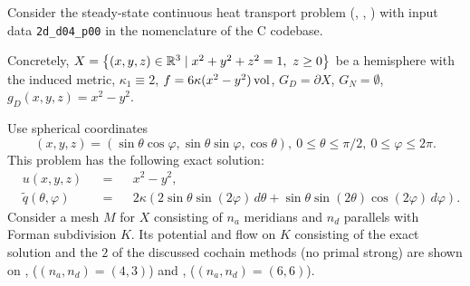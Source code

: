 \begin{example}
  \label{idec/diffusion/continuous/steady_state/examples/2d_d04_p00-example}
  Consider the steady-state continuous heat transport problem
  (,
   ,
   )
  with input data \verb|2d_d04_p00| in the nomenclature of the C codebase.

  Concretely,
    $X = \left\{ (x, y, z) \in \mathbb{R}^3 \mid x^2 + y^2 + z^2 = 1,\ z \geq 0 \right\}$ be a
      hemisphere with the induced metric,
    $\kappa_1 \equiv 2$,
    $f = 6 \kappa (x^2 - y^2) \mathop{\rm vol}\nolimits$,
    $G_D = \partial X$,
    $G_N = \emptyset$,
    $g_D(x, y, z) = x^2 - y^2$.

  Use spherical coordinates
  \begin{equation}
    (x, y, z)
    = (\sin \theta \cos \varphi, \sin \theta \sin \varphi, \cos \theta),\
    0 \leq \theta \leq \pi / 2,\
    0 \leq \varphi \leq 2 \pi.
  \end{equation}
  This problem has the following exact solution:
  \begin{subequations}
    \begin{alignat}{3}
      & u(x, y, z) && = && x^2 - y^2, \\
      & \tilde{q}(\theta, \varphi) &&
      = && 2 \kappa (2 \sin \theta \sin(2 \varphi)\, d \theta
                     + \sin \theta \sin(2 \theta) \cos (2 \varphi)\, d \varphi).
    \end{alignat}
  \end{subequations}
  Consider a mesh $M$ for $X$ consisting of $n_a$ meridians and $n_d$ parallels
  with Forman subdivision $K$.
  Its potential and flow on $K$ consisting of the exact solution and the $2$
  of the discussed cochain methods (no primal strong) are shown on
  ,
  ($(n_a, n_d) = (4, 3)$)
  and
  ,
  ($(n_a, n_d) = (6, 6)$).
\end{example}
